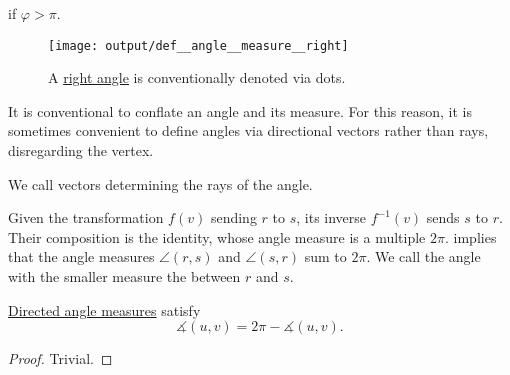\begin{definition}
\begin{thmenum}
\begin{thmenum}
      \medspace

        if \( \varphi > \pi \).
    \end{thmenum}

    \begin{figure}[!ht]
      \centering
      \texttt{[image: output/def\_\_angle\_\_measure\_\_right]}
      \caption{A \hyperref[def:angle/measure/right]{right angle} is conventionally denoted via dots.}\label{fig:def:angle/measure/right}
    \end{figure}

     It is conventional to conflate an angle and its measure. For this reason, it is sometimes convenient to define angles via directional vectors rather than rays, disregarding the vertex.

    We call vectors determining the rays  of the angle.

     Given the transformation \( f(v) \) sending \( r \) to \( s \), its inverse \( f^{-1}(v) \) sends \( s \) to \( r \). Their composition is the identity, whose angle measure is a multiple \( 2\pi \).  implies that the angle measures \( \angle(r, s) \) and \( \angle(s, r) \) sum to \( 2\pi \). We call the angle with the smaller measure the  between \( r \) and \( s \).
  \end{thmenum}
\end{definition}

\begin{proposition}\label{thm:angle_measure_swap}
  \hyperref[def:angle/measure]{Directed angle measures} satisfy
  \begin{equation}\label{eq:thm:angle_measure_swap}
    \measuredangle(u, v) = 2\pi - \measuredangle(u, v).
  \end{equation}
\end{proposition}
\begin{proof}
  Trivial.
\end{proof}

